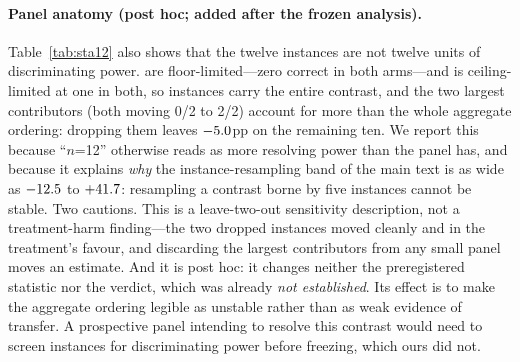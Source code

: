 \documentclass{article}
\begin{document}
\paragraph{Panel anatomy (post hoc; added after the frozen analysis).} Table~\ref{tab:sta12} also shows that the twelve instances are not twelve units of discriminating power. \StatStaFloorN{} are floor-limited---zero correct in both arms---and \StatStaCeilingN{} is ceiling-limited at one in both, so \StatStaInformativeN{} instances carry the entire contrast, and the two largest contributors (both moving 0/2 to 2/2) account for more than the whole aggregate ordering: dropping them leaves $-5.0$pp on the remaining ten. We report this because ``$n$=12'' otherwise reads as more resolving power than the panel has, and because it explains \emph{why} the instance-resampling band of the main text is as wide as $-12.5$ to $+41.7$: resampling a contrast borne by five instances cannot be stable. Two cautions. This is a leave-two-out sensitivity description, not a treatment-harm finding---the two dropped instances moved cleanly and in the treatment's favour, and discarding the largest contributors from any small panel moves an estimate. And it is post hoc: it changes neither the preregistered statistic nor the verdict, which was already \emph{not established}. Its effect is to make the aggregate ordering legible as unstable rather than as weak evidence of transfer. A prospective panel intending to resolve this contrast would need to screen instances for discriminating power before freezing, which ours did not.
\end{document}
